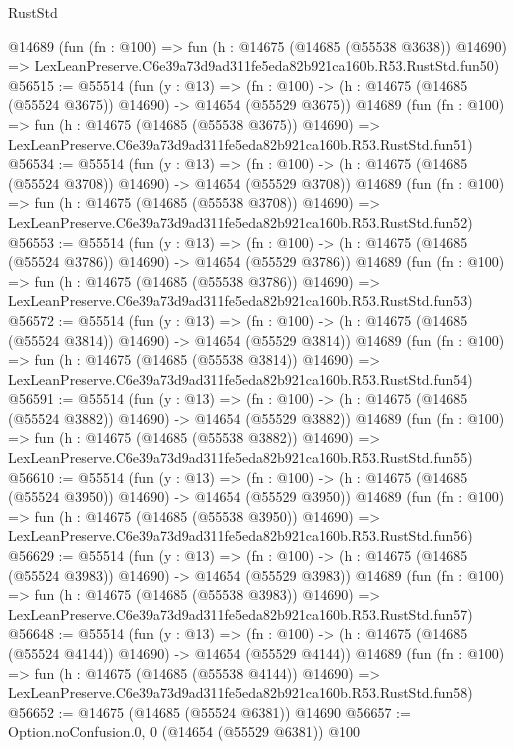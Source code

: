 \begin{lexlean}{RustStd}
\begin{coremodule}
    @14689
    (fun (fn : @100) =>
    fun (h : @14675 (@14685 (@55538 @3638)) @14690) =>
    LexLeanPreserve.C6e39a73d9ad311fe5eda82b921ca160b.R53.RustStd.fun50)
@56515 := @55514
    (fun (y : @13) =>
    (fn : @100) -> (h : @14675 (@14685 (@55524 @3675)) @14690) -> @14654 (@55529 @3675))
    @14689
    (fun (fn : @100) =>
    fun (h : @14675 (@14685 (@55538 @3675)) @14690) =>
    LexLeanPreserve.C6e39a73d9ad311fe5eda82b921ca160b.R53.RustStd.fun51)
@56534 := @55514
    (fun (y : @13) =>
    (fn : @100) -> (h : @14675 (@14685 (@55524 @3708)) @14690) -> @14654 (@55529 @3708))
    @14689
    (fun (fn : @100) =>
    fun (h : @14675 (@14685 (@55538 @3708)) @14690) =>
    LexLeanPreserve.C6e39a73d9ad311fe5eda82b921ca160b.R53.RustStd.fun52)
@56553 := @55514
    (fun (y : @13) =>
    (fn : @100) -> (h : @14675 (@14685 (@55524 @3786)) @14690) -> @14654 (@55529 @3786))
    @14689
    (fun (fn : @100) =>
    fun (h : @14675 (@14685 (@55538 @3786)) @14690) =>
    LexLeanPreserve.C6e39a73d9ad311fe5eda82b921ca160b.R53.RustStd.fun53)
@56572 := @55514
    (fun (y : @13) =>
    (fn : @100) -> (h : @14675 (@14685 (@55524 @3814)) @14690) -> @14654 (@55529 @3814))
    @14689
    (fun (fn : @100) =>
    fun (h : @14675 (@14685 (@55538 @3814)) @14690) =>
    LexLeanPreserve.C6e39a73d9ad311fe5eda82b921ca160b.R53.RustStd.fun54)
@56591 := @55514
    (fun (y : @13) =>
    (fn : @100) -> (h : @14675 (@14685 (@55524 @3882)) @14690) -> @14654 (@55529 @3882))
    @14689
    (fun (fn : @100) =>
    fun (h : @14675 (@14685 (@55538 @3882)) @14690) =>
    LexLeanPreserve.C6e39a73d9ad311fe5eda82b921ca160b.R53.RustStd.fun55)
@56610 := @55514
    (fun (y : @13) =>
    (fn : @100) -> (h : @14675 (@14685 (@55524 @3950)) @14690) -> @14654 (@55529 @3950))
    @14689
    (fun (fn : @100) =>
    fun (h : @14675 (@14685 (@55538 @3950)) @14690) =>
    LexLeanPreserve.C6e39a73d9ad311fe5eda82b921ca160b.R53.RustStd.fun56)
@56629 := @55514
    (fun (y : @13) =>
    (fn : @100) -> (h : @14675 (@14685 (@55524 @3983)) @14690) -> @14654 (@55529 @3983))
    @14689
    (fun (fn : @100) =>
    fun (h : @14675 (@14685 (@55538 @3983)) @14690) =>
    LexLeanPreserve.C6e39a73d9ad311fe5eda82b921ca160b.R53.RustStd.fun57)
@56648 := @55514
    (fun (y : @13) =>
    (fn : @100) -> (h : @14675 (@14685 (@55524 @4144)) @14690) -> @14654 (@55529 @4144))
    @14689
    (fun (fn : @100) =>
    fun (h : @14675 (@14685 (@55538 @4144)) @14690) =>
    LexLeanPreserve.C6e39a73d9ad311fe5eda82b921ca160b.R53.RustStd.fun58)
@56652 := @14675 (@14685 (@55524 @6381)) @14690
@56657 := Option.noConfusion.{0, 0} (@14654 (@55529 @6381)) @100

\end{coremodule}
\end{lexlean}
